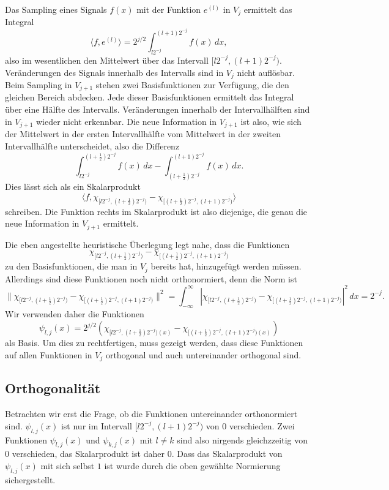 Das Sampling eines Signals $f(x)$ mit der Funktion $e^{(l)}$ in $V_j$
ermittelt das Integral
\[
\langle f,e^{(l)}\rangle
=
2^{j/2}
\int_{l2^{-j}}^{(l+1)2^{-j}} f(x)\,dx,
\]
also im wesentlichen den Mittelwert über das Intervall $[l2^{-j},(l+1)2^{-j})$.
Veränderungen des Signals innerhalb des Intervalls sind in $V_j$ nicht
auflösbar.
Beim Sampling in $V_{j+1}$ stehen zwei Basisfunktionen zur Verfügung, die
den gleichen Bereich abdecken.
Jede dieser Basisfunktionen ermittelt das Integral über eine Hälfte des
Intervalls.
Veränderungen innerhalb der Intervallhälften sind in $V_{j+1}$ wieder nicht
erkennbar.
Die neue Information in $V_{j+1}$ ist also, wie sich der Mittelwert
in der ersten Intervallhälfte vom Mittelwert in der zweiten Intervallhälfte
unterscheidet, also die Differenz
\[
\int_{l2^{-j}}^{(l+\frac12)2^{-j}} f(x)\,dx
-
\int_{(l+\frac12)2^{-j}}^{(l+1)2^{-j}} f(x)\,dx.
\]
Dies lässt sich als ein Skalarprodukt
\[
\langle f,
\chi_{[l2^{-j},(l+\frac12)2^{-j})}
-
\chi_{[(l+\frac12)2^{-j},(l+1)2^{-j})}
\rangle
\]
schreiben.
Die Funktion rechts im Skalarprodukt ist also diejenige, die genau die
neue Information in $V_{j+1}$ ermittelt.

Die eben angestellte heuristische Überlegung legt nahe, dass die Funktionen
\begin{equation}
\chi_{[l2^{-j},(l+\frac12)2^{-j})}
-
\chi_{[(l+\frac12)2^{-j},(l+1)2^{-j})}
\end{equation}
zu den Basisfunktionen, die man in $V_j$ bereits hat, hinzugefügt werden
müssen.
Allerdings sind diese Funktionen noch nicht orthonormiert, denn die
Norm ist
\[
\|
\chi_{[l2^{-j},(l+\frac12)2^{-j})}
-
\chi_{[(l+\frac12)2^{-j},(l+1)2^{-j})}
\|^2
=
\int_{-\infty}^\infty
|
\chi_{[l2^{-j},(l+\frac12)2^{-j})}
-
\chi_{[(l+\frac12)2^{-j},(l+1)2^{-j})}
|^2
\,dx
=
2^{-j}.
\]
Wir verwenden daher die Funktionen
\[
\psi_{l,j}(x) = 2^{j/2}(
\chi_{[l2^{-j},(l+\frac12)2^{-j})(x)}
-
\chi_{[(l+\frac12)2^{-j},(l+1)2^{-j})(x)}
)
\]
als Basis.
Um dies zu rechtfertigen, muss gezeigt werden, dass diese Funktionen auf
allen Funktionen in $V_j$ orthogonal und auch untereinander orthogonal
sind.

\subsection{Orthogonalität}
Betrachten wir erst die Frage, ob die Funktionen untereinander orthonormiert
sind.
$\psi_{l,j}(x)$ ist nur im Intervall $[l2^{-j},(l+1)2^{-j})$ von $0$
verschieden.
Zwei Funktionen $\psi_{l,j}(x)$ und $\psi_{k,j}(x)$ mit $l\ne k$ sind
also nirgends gleichzzeitig von $0$ verschieden, das Skalarprodukt ist
daher $0$.
Dass das Skalarprodukt von $\psi_{l,j}(x)$ mit sich selbst $1$ ist wurde
durch die oben gewählte Normierung sichergestellt.

